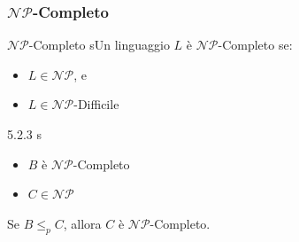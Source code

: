 \documentclass{article}  %
\theoremstyle{definition}
\begin{document}
\subsubsection{$\mathcal{NP}$-Completo}
\begin{theorem}{$\mathcal{NP}$-Completo}
	sUn linguaggio $L$ è $\mathcal{NP}$-Completo se:
	\begin{itemize}
		\item $L \in \mathcal{NP}$, e
		\item $L \in \mathcal{NP}$-Difficile
	\end{itemize}
\end{theorem}
\begin{theorem}{5.2.3}
	s
	\begin{itemize}
		\item $B$ è $\mathcal{NP}$-Completo
		\item $C \in \mathcal{NP}$
	\end{itemize}
	Se $B \leq_p C$, allora $C$ è $\mathcal{NP}$-Completo.
\end{theorem}
\end{document}
